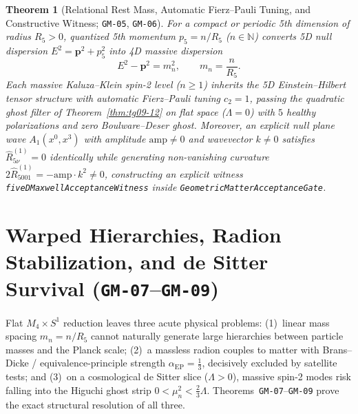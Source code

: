\documentclass[11pt,a4paper]{article}
\theoremstyle{plain}
\newtheorem{theorem}{Theorem}[section]
\theoremstyle{remark}
\newcommand{\Rhat}{\widehat{R}}
\newcommand{\code}[1]{\texttt{\small #1}}
\begin{document}
\begin{theorem}[Relational Rest Mass, Automatic Fierz--Pauli Tuning, and Constructive Witness; \code{GM-05}, \code{GM-06}]
\label{thm:gm05-06}
For a compact or periodic 5th dimension of radius $R_5 > 0$, quantized 5th momentum $p_5 = n / R_5$ ($n \in \mathbb{N}$) converts 5D null dispersion $E^2 = \mathbf{p}^2 + p_5^2$ into 4D massive dispersion
\begin{equation}
  E^2 - \mathbf{p}^2 = m_n^2, \qquad m_n = \frac{n}{R_5}.
\end{equation}
Each massive Kaluza--Klein spin-2 level ($n \ge 1$) inherits the 5D Einstein--Hilbert tensor structure with automatic Fierz--Pauli tuning $c_2 = 1$, passing the quadratic ghost filter of Theorem~\ref{thm:tg09-12} on flat space ($\Lambda = 0$) with $5$ healthy polarizations and zero Boulware--Deser ghost. Moreover, an explicit null plane wave $A_1(x^0,x^3)$ with amplitude $\mathrm{amp} \neq 0$ and wavevector $k \neq 0$ satisfies $\Rhat^{(1)}_{5\nu} = 0$ identically while generating non-vanishing curvature $2\Rhat^{(1)}_{5001} = -\mathrm{amp}\cdot k^2 \neq 0$, constructing an explicit witness \code{fiveDMaxwellAcceptanceWitness} inside \code{GeometricMatterAcceptanceGate}.
\end{theorem}

\section{Warped Hierarchies, Radion Stabilization, and de Sitter Survival (\code{GM-07}--\code{GM-09})}
\label{sec:warped-stabilization}

Flat $M_4 \times S^1$ reduction leaves three acute physical problems: (1)~linear mass spacing $m_n = n/R_5$ cannot naturally generate large hierarchies between particle masses and the Planck scale; (2)~a massless radion couples to matter with Brans--Dicke / equivalence-principle strength $\alpha_{\mathrm{EP}} = \tfrac{1}{3}$, decisively excluded by satellite tests; and (3)~on a cosmological de Sitter slice ($\Lambda > 0$), massive spin-2 modes risk falling into the Higuchi ghost strip $0 < \mu_n^2 < \tfrac{2}{3}\Lambda$. Theorems~\code{GM-07}--\code{GM-09} prove the exact structural resolution of all three.
\end{document}
